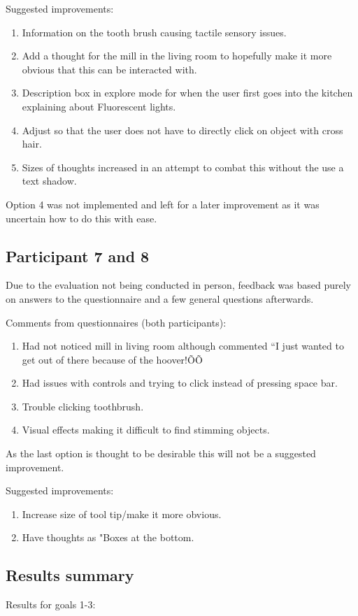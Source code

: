 \documentclass[11pt]{report}
\begin{document}
Suggested improvements:
\begin{enumerate}
\item Information on the tooth brush causing tactile sensory issues. 
\item Add a thought for the mill in the living room to hopefully make it more obvious that this can be interacted with. 
\item Description box in explore mode for when the user first goes into the kitchen explaining about Fluorescent lights. 
\item Adjust so that the user does not have to directly click on object with cross hair.
\item Sizes of thoughts increased in an attempt to combat this without the use a text shadow. 
\end{enumerate}

Option 4 was not implemented and left for a later improvement as it was uncertain how to do this with ease. 

\subsection*{Participant 7 and 8}
Due to the evaluation not being conducted in person, feedback was based purely on answers to the questionnaire and a few general questions afterwards. 

Comments from questionnaires (both participants):
\begin{enumerate}
\item Had not noticed mill in living room although commented ``I just wanted to get out of there because of the hoover!ÕÕ
\item Had issues with controls and trying to click instead of pressing space bar.
\item Trouble clicking toothbrush.
\item Visual effects making it difficult to find stimming objects.
\end{enumerate}

As the last option is thought to be desirable this will not be a suggested improvement. 

Suggested improvements:
\begin{enumerate}
\item Increase size of tool tip/make it more obvious.
\item Have thoughts as "Boxes at the bottom.
\end{enumerate}

\subsection*{Results summary}
Results for goals 1-3:
\end{document}

